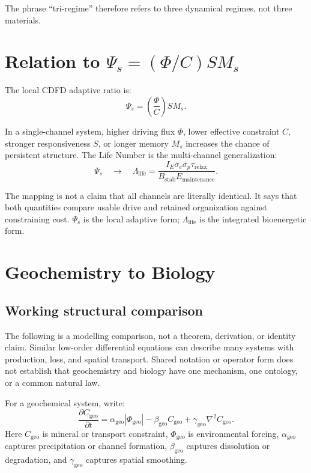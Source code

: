 \documentclass[11pt,a4paper]{article}
\begin{document}
The phrase ``tri-regime'' therefore refers to three dynamical regimes, not three materials.

\section{Relation to \texorpdfstring{$\Psi_s=(\Phi/C)SM_s$}{Psi = Phi/C}}

The local CDFD adaptive ratio is:
\begin{equation}
 \Psi_s=\left(\frac{\Phi}{C}\right)SM_s.
\end{equation}

In a single-channel system, higher driving flux $\Phi$, lower effective constraint $C$, stronger responsiveness $S$, or longer memory $M_s$ increases the chance of persistent structure. The Life Number is the multi-channel generalization:
\begin{equation}
 \Psi_s \quad \longrightarrow \quad
 \Lambda_{\mathrm{life}} =
 \frac{I_E \bar{\sigma}_e \bar{\sigma}_p \tau_{\mathrm{relax}}}
 {B_{\mathrm{stab}} E_{\mathrm{maintenance}}}.
\end{equation}

The mapping is not a claim that all channels are literally identical. It says that both quantities compare usable drive and retained organization against constraining cost. $\Psi_s$ is the local adaptive form; $\Lambda_{\mathrm{life}}$ is the integrated bioenergetic form.

\section{Geochemistry to Biology}

\subsection{Working structural comparison}

The following is a modelling comparison, not a theorem, derivation, or
identity claim. Similar low-order differential equations can describe many
systems with production, loss, and spatial transport. Shared notation or
operator form does not establish that geochemistry and biology have one
mechanism, one ontology, or a common natural law.

For a geochemical system, write:
\begin{equation}
 \frac{\partial C_{\mathrm{geo}}}{\partial t}
 =
 \alpha_{\mathrm{geo}}|\Phi_{\mathrm{geo}}|
 -\beta_{\mathrm{geo}}C_{\mathrm{geo}}
 +\gamma_{\mathrm{geo}}\nabla^2C_{\mathrm{geo}}.
\end{equation}
Here $C_{\mathrm{geo}}$ is mineral or transport constraint, $\Phi_{\mathrm{geo}}$ is environmental forcing, $\alpha_{\mathrm{geo}}$ captures precipitation or channel formation, $\beta_{\mathrm{geo}}$ captures dissolution or degradation, and $\gamma_{\mathrm{geo}}$ captures spatial smoothing.
\end{document}
